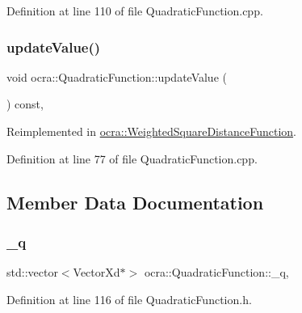 Definition at line 110 of file Quadratic\+Function.\+cpp.

\hypertarget{classocra_1_1QuadraticFunction_aad5171c1f1b510fb861121da01a0ea75}{}\label{classocra_1_1QuadraticFunction_aad5171c1f1b510fb861121da01a0ea75} 
\subsubsection{\texorpdfstring{update\+Value()}{updateValue()}}
{\footnotesize\ttfamily void ocra\+::\+Quadratic\+Function\+::update\+Value (\begin{DoxyParamCaption}{ }\end{DoxyParamCaption}) const\hspace{0.3cm}{\ttfamily [protected]}, {\ttfamily [virtual]}}



Reimplemented in \hyperlink{classocra_1_1WeightedSquareDistanceFunction_a3edae3085677a5ac54b4d5bcdfcc1901}{ocra\+::\+Weighted\+Square\+Distance\+Function}.



Definition at line 77 of file Quadratic\+Function.\+cpp.



\subsection{Member Data Documentation}
\hypertarget{classocra_1_1QuadraticFunction_a0019bf700f128841e50dbceaa4c75dd2}{}\label{classocra_1_1QuadraticFunction_a0019bf700f128841e50dbceaa4c75dd2} 
\subsubsection{\texorpdfstring{\+\_\+q}{\_q}}
{\footnotesize\ttfamily std\+::vector$<$Vector\+Xd$\ast$$>$ ocra\+::\+Quadratic\+Function\+::\+\_\+q\hspace{0.3cm}{\ttfamily [mutable]}, {\ttfamily [protected]}}



Definition at line 116 of file Quadratic\+Function.\+h.

\hypertarget{classocra_1_1QuadraticFunction_adc8b30315f5cef54f2318c93844a6a66}{}\label{classocra_1_1QuadraticFunction_adc8b30315f5cef54f2318c93844a6a66} 
